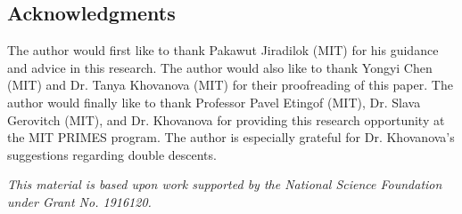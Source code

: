 \documentclass[11pt, a4paper, reqno]{article}
\numberwithin{equation}{section}
\theoremstyle{definition}
\begin{document}
    \begin{flushleft}
	\section{Acknowledgments}
	 The author would first like to thank Pakawut Jiradilok (MIT) for his guidance and advice in this research. The author would also like to thank Yongyi Chen (MIT) and Dr. Tanya Khovanova (MIT) for their proofreading of this paper.	The author would finally like to thank Professor Pavel Etingof (MIT), Dr. Slava Gerovitch (MIT), and Dr. Khovanova for providing this research opportunity at the MIT PRIMES program. The author is especially grateful for Dr. Khovanova's suggestions regarding double descents.
	 
	 \textit{This material is based upon work supported by the National Science Foundation under Grant No. 1916120.}
	 \end{flushleft}
	\newpage
\end{document}
